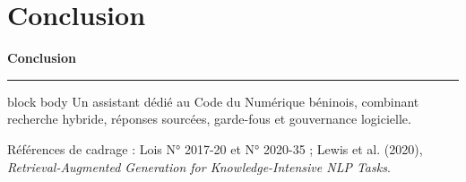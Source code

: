\documentclass[aspectratio=169,10pt]{beamer}
\begin{document}
\section{Conclusion}
\begin{frame}[plain]
  \centering\vspace{0.8cm}
  {\Huge\color{navy}\bfseries Conclusion\par}
  \vspace{0.45cm}\color{gold}\rule{0.22\paperwidth}{1.4pt}\par
  \vspace{0.45cm}
  \begin{beamercolorbox}[rounded=true,sep=1.1em,wd=.82\paperwidth,center]{block body}
    \Large Un assistant dédié au Code du Numérique béninois, combinant recherche hybride, réponses sourcées, garde-fous et gouvernance logicielle.
  \end{beamercolorbox}
  \vspace{0.25cm}{\normalsize Questions ?\par}
  \vfill{\scriptsize Références de cadrage : Lois N° 2017-20 et N° 2020-35 ; Lewis et al. (2020), \textit{Retrieval-Augmented Generation for Knowledge-Intensive NLP Tasks}.\par}
\end{frame}
\end{document}
